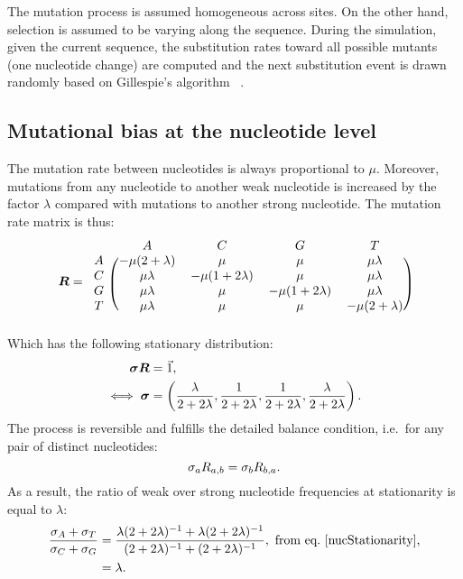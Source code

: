 The mutation process is assumed homogeneous across sites.
On the other hand, selection is assumed to be varying along the sequence.
During the simulation, given the current sequence, the substitution rates toward all possible mutants (one nucleotide change) are computed and the next substitution event is drawn randomly based on Gillespie’s algorithm ~\citep{Gillespie1977}.

\subsection{Mutational bias at the nucleotide level}
\label{sec:mut-bias-mut-matrix}
The mutation rate between nucleotides is always proportional to $\mu$.
Moreover, mutations from any nucleotide to another weak nucleotide is increased by the factor $\lambda$ compared with mutations to another strong nucleotide.
The mutation rate matrix is thus:
\begin{equation}
    \label{nucMatrix}
    \Mutmatrix =
    \begin{blockarray}{ccccc}
        & A & C & G & T \\
        \begin{block}{c(cccc)}
            A & {-\mu(2 + \lambda)} & {\mu} & {\mu} & {\mu \lambda} \\
            C & {\mu \lambda} & {-\mu(1 + 2\lambda)} & {\mu} & {\mu \lambda} \\
            G & {\mu \lambda} & {\mu} & {-\mu(1 + 2\lambda)} & {\mu \lambda} \\
            T & {\mu \lambda} & {\mu} & {\mu} & {-\mu(2 + \lambda)} \\
        \end{block}
    \end{blockarray}
\end{equation}
Which has the following stationary distribution:
\begin{align}
    \bm{\sigma} \bm{R} & = \vec{1}, \\
    \iff \bm{\sigma} & = \left( \dfrac{\lambda}{2+2\lambda}, \dfrac{1}{2+2\lambda}, \dfrac{1}{2+2\lambda}, \dfrac{\lambda}{2+2\lambda} \right).
    \label{nucStationarity}
\end{align}
The process is reversible and fulfills the detailed balance condition, i.e.~for any pair of distinct nucleotides:
\begin{equation}
    \sigma_a R_{a, b} =\sigma_b R_{b, a}.
    \label{nucMutBalance}
\end{equation}
As a result, the ratio of weak over strong nucleotide frequencies at stationarity is equal to $\lambda$:
\begin{align}
    \label{lambda}
    \dfrac{ \mutequi_A + \mutequi_T }{ \mutequi_C + \mutequi_G }
    & = \dfrac{ \lambda ( 2 + 2 \lambda)^{-1} + \lambda ( 2 + 2 \lambda)^{-1}}{ ( 2 + 2 \lambda)^{-1} + ( 2 + 2 \lambda)^{-1}}, \ \text{from eq.~\ref{nucStationarity},}\\
    & = \lambda.
\end{align}

